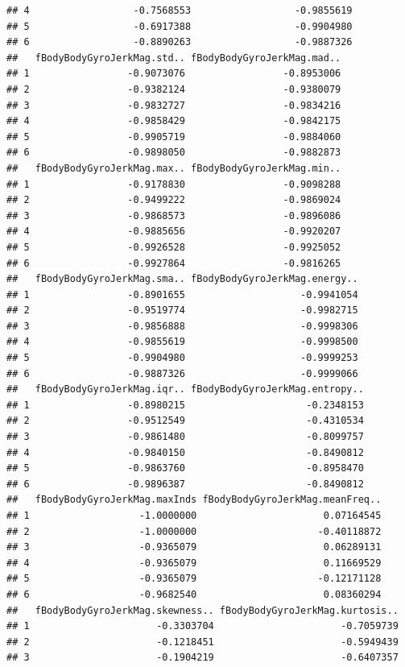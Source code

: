 \documentclass[
]{article}
\begin{document}
\begin{verbatim}
## 4                  -0.7568553                  -0.9855619
## 5                  -0.6917388                  -0.9904980
## 6                  -0.8890263                  -0.9887326
##   fBodyBodyGyroJerkMag.std.. fBodyBodyGyroJerkMag.mad..
## 1                 -0.9073076                 -0.8953006
## 2                 -0.9382124                 -0.9380079
## 3                 -0.9832727                 -0.9834216
## 4                 -0.9858429                 -0.9842175
## 5                 -0.9905719                 -0.9884060
## 6                 -0.9898050                 -0.9882873
##   fBodyBodyGyroJerkMag.max.. fBodyBodyGyroJerkMag.min..
## 1                 -0.9178830                 -0.9098288
## 2                 -0.9499222                 -0.9869024
## 3                 -0.9868573                 -0.9896086
## 4                 -0.9885656                 -0.9920207
## 5                 -0.9926528                 -0.9925052
## 6                 -0.9927864                 -0.9816265
##   fBodyBodyGyroJerkMag.sma.. fBodyBodyGyroJerkMag.energy..
## 1                 -0.8901655                    -0.9941054
## 2                 -0.9519774                    -0.9982715
## 3                 -0.9856888                    -0.9998306
## 4                 -0.9855619                    -0.9998500
## 5                 -0.9904980                    -0.9999253
## 6                 -0.9887326                    -0.9999066
##   fBodyBodyGyroJerkMag.iqr.. fBodyBodyGyroJerkMag.entropy..
## 1                 -0.8980215                     -0.2348153
## 2                 -0.9512549                     -0.4310534
## 3                 -0.9861480                     -0.8099757
## 4                 -0.9840150                     -0.8490812
## 5                 -0.9863760                     -0.8958470
## 6                 -0.9896387                     -0.8490812
##   fBodyBodyGyroJerkMag.maxInds fBodyBodyGyroJerkMag.meanFreq..
## 1                   -1.0000000                      0.07164545
## 2                   -1.0000000                     -0.40118872
## 3                   -0.9365079                      0.06289131
## 4                   -0.9365079                      0.11669529
## 5                   -0.9365079                     -0.12171128
## 6                   -0.9682540                      0.08360294
##   fBodyBodyGyroJerkMag.skewness.. fBodyBodyGyroJerkMag.kurtosis..
## 1                      -0.3303704                      -0.7059739
## 2                      -0.1218451                      -0.5949439
## 3                      -0.1904219                      -0.6407357

\end{verbatim}
\end{document}
